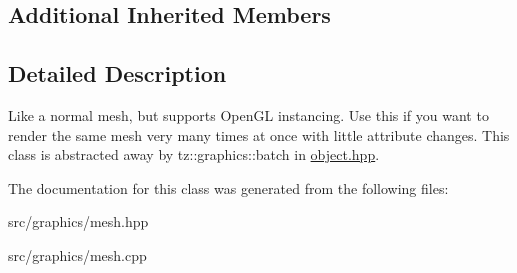 \subsection*{Additional Inherited Members}


\subsection{Detailed Description}
Like a normal mesh, but supports Open\+GL instancing. Use this if you want to render the same mesh very many times at once with little attribute changes. This class is abstracted away by tz\+::graphics\+::batch in \mbox{\hyperlink{object_8hpp_source}{object.\+hpp}}. 

The documentation for this class was generated from the following files\+:\begin{DoxyCompactItemize}
\item 
src/graphics/mesh.\+hpp\item 
src/graphics/mesh.\+cpp\end{DoxyCompactItemize}
